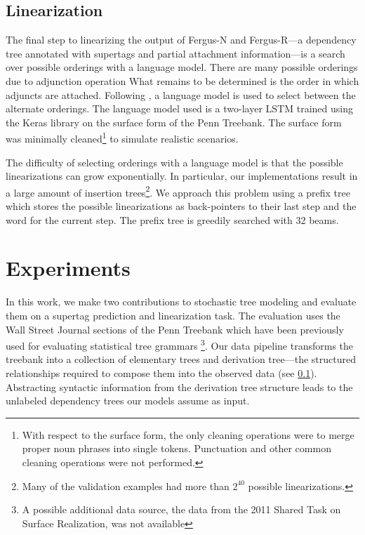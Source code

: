 \documentclass[11pt]{article}
\begin{document}
\subsection{Linearization}

The final step to linearizing the output of Fergus-N and Fergus-R---a dependency tree annotated with supertags and partial attachment information---is a search over possible orderings with a language model. 
%
There are many possible orderings due to adjunction operation
What remains to be determined is the order in which adjuncts are attached. 
%
Following , a language model is used to select between the alternate orderings. 
%
The language model used is a two-layer LSTM trained using the Keras library on
the surface form of the Penn Treebank.
%
The surface form was minimally cleaned\footnote{With respect to the surface form, the only
cleaning operations were to merge proper noun phrases into single tokens.  Punctuation and other
common cleaning operations were not performed.} to simulate realistic scenarios.

The difficulty of selecting orderings with a language model is that the possible linearizations can grow exponentially.
%
In particular, our implementations result in a large amount of insertion trees\footnote{Many of the validation examples had more than $2^{40}$ possible linearizations.}.
%
We approach this problem using a prefix tree which stores the possible linearizations as back-pointers to their last step and the word for the current step. 
%
The prefix tree is greedily searched with 32 beams.




\section{Experiments}
\label{sec:expt}

In this work, we make two contributions to stochastic tree modeling and evaluate them on a supertag prediction and linearization task. 
%
The evaluation uses the Wall Street Journal sections of the Penn Treebank which have been previously used for evaluating statistical tree grammars \cite{chiang2000statistical}\footnote{A possible additional data source, the data from the 2011 Shared Task on Surface Realization, was not available}.
%
Our data pipeline transforms the treebank into a collection of elementary trees and derivation tree---the structured relationships required to compose them into the observed data (see \ref{}).
%
Abstracting syntactic information from the derivation tree structure leads to the unlabeled dependency trees our models assume as input. 
\end{document}

